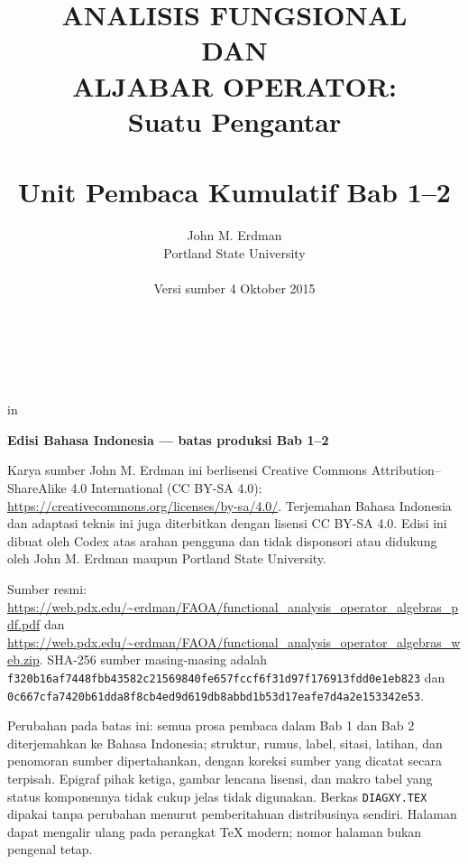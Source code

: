 \documentclass[11pt,reqno]{amsbook}
\theoremstyle{definition}
\theoremstyle{remark}
\numberwithin{equation}{section}
\begin{document}
 \frontmatter
 \title{ANALISIS FUNGSIONAL \\ DAN \\ ALJABAR OPERATOR: \\ Suatu Pengantar \\ \mbox{} \\ \large Unit Pembaca Kumulatif Bab 1--2}
 \author{John M. Erdman \\
      Portland State University \\
      \mbox{\hphantom{P}} \\
      Versi sumber 4 Oktober 2015 \\
      \mbox{\hphantom{P}} \\
      \mbox{\hphantom{P}} \\
            \mbox{\hphantom{P}} \\
                  \mbox{\hphantom{P}} }


 in


\maketitle


\begin{center}
\textbf{Edisi Bahasa Indonesia --- batas produksi Bab 1--2}
\end{center}

Karya sumber John M. Erdman ini berlisensi Creative Commons
Attribution--ShareAlike 4.0 International (CC BY-SA 4.0):
\url{https://creativecommons.org/licenses/by-sa/4.0/}.
Terjemahan Bahasa Indonesia dan adaptasi teknis ini juga diterbitkan dengan
lisensi CC BY-SA 4.0. Edisi ini dibuat oleh Codex atas arahan pengguna dan tidak
disponsori atau didukung oleh John M. Erdman maupun Portland State University.

\begin{sloppypar}
Sumber resmi:
\url{https://web.pdx.edu/~erdman/FAOA/functional_analysis_operator_algebras_pdf.pdf}
dan
\url{https://web.pdx.edu/~erdman/FAOA/functional_analysis_operator_algebras_web.zip}.
SHA-256 sumber masing-masing adalah
\texttt{f320b16af7448fbb43582c21569840fe\allowbreak657fccf6f31d97f176913fdd0e1eb823}
dan
\texttt{0c667cfa7420b61dda8f8cb4ed9d619d\allowbreak b8abbd1b53d17eafe7d4a2e153342e53}.
\end{sloppypar}

Perubahan pada batas ini: semua prosa pembaca dalam Bab 1 dan Bab 2
diterjemahkan ke Bahasa Indonesia; struktur, rumus, label, sitasi, latihan,
dan penomoran sumber dipertahankan, dengan koreksi sumber yang dicatat secara
terpisah. Epigraf pihak ketiga, gambar lencana lisensi, dan makro tabel yang
status komponennya tidak cukup jelas tidak digunakan. Berkas
\texttt{DIAGXY.TEX} dipakai tanpa perubahan menurut pemberitahuan distribusinya
sendiri. Halaman dapat
mengalir ulang pada perangkat TeX modern; nomor halaman bukan pengenal tetap.
\end{document}
